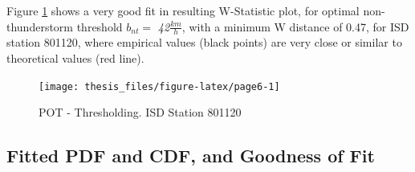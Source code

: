 \documentclass[12pt,oneside]{reedthesis}
\begin{document}
Figure \ref{fig:page6} shows a very good fit in resulting W-Statistic plot, for optimal non-thunderstorm threshold \(b_{nt} =\) \emph{42}\(\frac{km}{h}\), with a minimum W distance of 0.47, for ISD station 801120, where empirical values (black points) are very close or similar to theoretical values (red line).

\footnotesize
\begin{figure}

{\centering \texttt{[image: thesis\_files/figure-latex/page6-1]} 

}

\caption{POT - Thresholding. ISD Station 801120}\label{fig:page6}
\end{figure}
\normalsize

\hypertarget{fitted-pdf-and-cdf-and-goodness-of-fit}{%
\subsection{Fitted PDF and CDF, and Goodness of Fit}\label{fitted-pdf-and-cdf-and-goodness-of-fit}}
\end{document}
